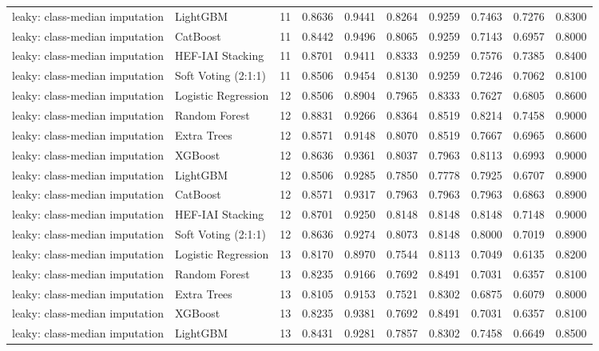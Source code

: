 \begin{tabular}{llrrrrrrrr}
leaky: class-median imputation & LightGBM & 11 & 0.8636 & 0.9441 & 0.8264 & 0.9259 & 0.7463 & 0.7276 & 0.8300 \\
leaky: class-median imputation & CatBoost & 11 & 0.8442 & 0.9496 & 0.8065 & 0.9259 & 0.7143 & 0.6957 & 0.8000 \\
leaky: class-median imputation & HEF-IAI Stacking & 11 & 0.8701 & 0.9411 & 0.8333 & 0.9259 & 0.7576 & 0.7385 & 0.8400 \\
leaky: class-median imputation & Soft Voting (2:1:1) & 11 & 0.8506 & 0.9454 & 0.8130 & 0.9259 & 0.7246 & 0.7062 & 0.8100 \\
leaky: class-median imputation & Logistic Regression & 12 & 0.8506 & 0.8904 & 0.7965 & 0.8333 & 0.7627 & 0.6805 & 0.8600 \\
leaky: class-median imputation & Random Forest & 12 & 0.8831 & 0.9266 & 0.8364 & 0.8519 & 0.8214 & 0.7458 & 0.9000 \\
leaky: class-median imputation & Extra Trees & 12 & 0.8571 & 0.9148 & 0.8070 & 0.8519 & 0.7667 & 0.6965 & 0.8600 \\
leaky: class-median imputation & XGBoost & 12 & 0.8636 & 0.9361 & 0.8037 & 0.7963 & 0.8113 & 0.6993 & 0.9000 \\
leaky: class-median imputation & LightGBM & 12 & 0.8506 & 0.9285 & 0.7850 & 0.7778 & 0.7925 & 0.6707 & 0.8900 \\
leaky: class-median imputation & CatBoost & 12 & 0.8571 & 0.9317 & 0.7963 & 0.7963 & 0.7963 & 0.6863 & 0.8900 \\
leaky: class-median imputation & HEF-IAI Stacking & 12 & 0.8701 & 0.9250 & 0.8148 & 0.8148 & 0.8148 & 0.7148 & 0.9000 \\
leaky: class-median imputation & Soft Voting (2:1:1) & 12 & 0.8636 & 0.9274 & 0.8073 & 0.8148 & 0.8000 & 0.7019 & 0.8900 \\
leaky: class-median imputation & Logistic Regression & 13 & 0.8170 & 0.8970 & 0.7544 & 0.8113 & 0.7049 & 0.6135 & 0.8200 \\
leaky: class-median imputation & Random Forest & 13 & 0.8235 & 0.9166 & 0.7692 & 0.8491 & 0.7031 & 0.6357 & 0.8100 \\
leaky: class-median imputation & Extra Trees & 13 & 0.8105 & 0.9153 & 0.7521 & 0.8302 & 0.6875 & 0.6079 & 0.8000 \\
leaky: class-median imputation & XGBoost & 13 & 0.8235 & 0.9381 & 0.7692 & 0.8491 & 0.7031 & 0.6357 & 0.8100 \\
leaky: class-median imputation & LightGBM & 13 & 0.8431 & 0.9281 & 0.7857 & 0.8302 & 0.7458 & 0.6649 & 0.8500 \\

\end{tabular}
